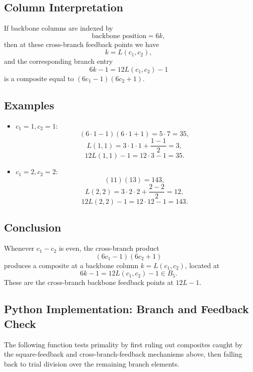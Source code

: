 \documentclass[12pt]{article}
\begin{document}
\subsection*{Column Interpretation}
If backbone columns are indexed by
\[
\text{backbone position} = 6k,
\]
then at these cross-branch feedback points we have
\[
k = L(c_1,c_2),
\]
and the corresponding branch entry
\[
6k - 1 = 12L(c_1,c_2) - 1
\]
is a composite equal to $(6c_1 - 1)(6c_2 + 1)$.

\subsection*{Examples}
\begin{itemize}
\item $c_1 = 1, c_2 = 1$:
\[
(6\cdot 1 - 1)(6\cdot 1 + 1) = 5\cdot 7 = 35,
\]
\[
L(1,1) = 3\cdot 1\cdot 1 + \frac{1-1}{2} = 3,
\]
\[
12L(1,1) - 1 = 12\cdot 3 - 1 = 35.
\]

\item $c_1 = 2, c_2 = 2$:
\[
(11)(13) = 143,
\]
\[
L(2,2) = 3\cdot 2\cdot 2 + \frac{2-2}{2} = 12,
\]
\[
12L(2,2) - 1 = 12\cdot 12 - 1 = 143.
\]
\end{itemize}

\subsection*{Conclusion}
Whenever $c_1 - c_2$ is even, the cross-branch product
\[
(6c_1 - 1)(6c_2 + 1)
\]
produces a composite at a backbone column $k = L(c_1,c_2)$, located at
\[
6k - 1 = 12L(c_1,c_2) - 1 \in B_5.
\]
These are the cross-branch backbone feedback points at $12L-1$.

\subsection*{Python Implementation: Branch and Feedback Check}
The following function tests primality by first ruling out composites caught
by the square-feedback and cross-branch-feedback mechanisms above, then
falling back to trial division over the remaining branch elements.
\end{document}
